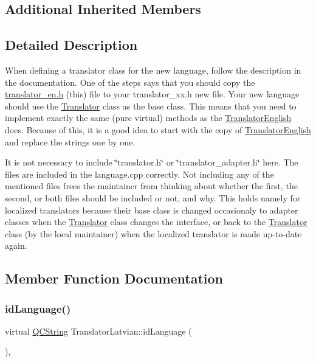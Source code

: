 \subsection*{Additional Inherited Members}


\subsection{Detailed Description}
When defining a translator class for the new language, follow the description in the documentation. One of the steps says that you should copy the \mbox{\hyperlink{translator__en_8h_source}{translator\+\_\+en.\+h}} (this) file to your translator\+\_\+xx.\+h new file. Your new language should use the \mbox{\hyperlink{class_translator}{Translator}} class as the base class. This means that you need to implement exactly the same (pure virtual) methods as the \mbox{\hyperlink{class_translator_english}{Translator\+English}} does. Because of this, it is a good idea to start with the copy of \mbox{\hyperlink{class_translator_english}{Translator\+English}} and replace the strings one by one.

It is not necessary to include \char`\"{}translator.\+h\char`\"{} or \char`\"{}translator\+\_\+adapter.\+h\char`\"{} here. The files are included in the language.\+cpp correctly. Not including any of the mentioned files frees the maintainer from thinking about whether the first, the second, or both files should be included or not, and why. This holds namely for localized translators because their base class is changed occasionaly to adapter classes when the \mbox{\hyperlink{class_translator}{Translator}} class changes the interface, or back to the \mbox{\hyperlink{class_translator}{Translator}} class (by the local maintainer) when the localized translator is made up-\/to-\/date again. 

\subsection{Member Function Documentation}
\mbox{\label{class_translator_latvian_a724d8bb368bebdb041ca89a028dacaa9}} 
\subsubsection{\texorpdfstring{idLanguage()}{idLanguage()}}
{\footnotesize\ttfamily virtual \mbox{\hyperlink{class_q_c_string}{Q\+C\+String}} Translator\+Latvian\+::id\+Language (\begin{DoxyParamCaption}{ }\end{DoxyParamCaption})\hspace{0.3cm}{\ttfamily [inline]}, {\ttfamily [virtual]}}

